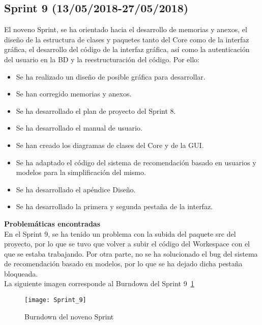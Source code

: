 \subsection{\textbf{Sprint 9} (13/05/2018-27/05/2018) }
El noveno  Sprint, se ha orientado hacia el desarrollo de memorias y anexos, el diseño de la estructura de clases y paquetes tanto del Core como de la interfaz gráfica, el desarrollo del código de la interfaz gráfica, así como la autenticación del usuario en la BD y la reestructuración del código. 
Por ello: 
\begin{itemize}
\item Se ha realizado un diseño de posible gráfica para desarrollar. 
\item Se han corregido memorias y anexos.
\item Se ha desarrollado el plan de proyecto del Sprint 8.
\item Se ha desarrollado el manual de usuario.
\item Se han creado los diagramas de clases del Core y de la GUI. 
\item Se ha adaptado el código del sistema de recomendación basado en usuarios y modelos para la simplificación del mismo. 
\item Se ha desarrollado el apéndice Diseño. 
\item Se ha desarrollado la primera y segunda pestaña de la interfaz. 
\end{itemize}
\textbf{Problemáticas encontradas}\\En el Sprint 9, se ha tenido un problema con la subida del paquete src del proyecto, por lo que se tuvo que  volver a subir el código del Workespace con el que se estaba trabajando. Por otra parte, no se ha solucionado el  bug del sistema de recomendación basado en modelos, por lo que se ha dejado dicha pestaña bloqueada. 
 \\La siguiente imagen corresponde al Burndown del Sprint 9~\ref{fig:A.2.9}
\begin{figure}[h]
\centering
\texttt{[image: Sprint\_9]}
\caption{Burndown del noveno Sprint}
\label{fig:A.2.9}
\end{figure}
\\

